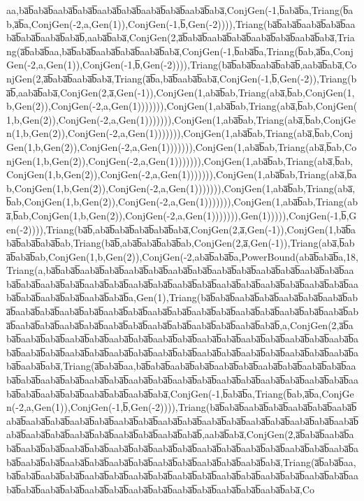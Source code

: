 aa,ba̅b̅aba̅b̅aaba̅b̅aba̅b̅aaba̅b̅aba̅b̅aaba̅b̅aba̅b̅aaba̅b̅aba̅,ConjGen(-1,b̅aba̅b̅a,Triang(b̅ab,a̅b̅a,ConjGen(-2,a,Gen(1)),ConjGen(-1,b̅,Gen(-2)))),Triang(ba̅b̅aba̅b̅aaba̅b̅aba̅b̅aaba̅b̅aba̅b̅aaba̅b̅aba̅b̅,aaba̅b̅aba̅,ConjGen(2,a̅b̅aba̅b̅aaba̅b̅aba̅b̅aaba̅b̅aba̅b̅aaba̅b̅aba̅,Triang(a̅b̅aba̅b̅aa,ba̅b̅aba̅b̅aaba̅b̅aba̅b̅aaba̅b̅aba̅,ConjGen(-1,b̅aba̅b̅a,Triang(b̅ab,a̅b̅a,ConjGen(-2,a,Gen(1)),ConjGen(-1,b̅,Gen(-2)))),Triang(ba̅b̅aba̅b̅aaba̅b̅aba̅b̅,aaba̅b̅aba̅,ConjGen(2,a̅b̅aba̅b̅aaba̅b̅aba̅,Triang(a̅b̅a,ba̅b̅aaba̅b̅aba̅,ConjGen(-1,b̅,Gen(-2)),Triang(ba̅b̅,aaba̅b̅aba̅,ConjGen(2,a̅,Gen(-1)),ConjGen(1,aba̅b̅ab,Triang(aba̅,b̅ab,ConjGen(1,b,Gen(2)),ConjGen(-2,a,Gen(1))))))),ConjGen(1,aba̅b̅ab,Triang(aba̅,b̅ab,ConjGen(1,b,Gen(2)),ConjGen(-2,a,Gen(1))))))),ConjGen(1,aba̅b̅ab,Triang(aba̅,b̅ab,ConjGen(1,b,Gen(2)),ConjGen(-2,a,Gen(1))))))),ConjGen(1,aba̅b̅ab,Triang(aba̅,b̅ab,ConjGen(1,b,Gen(2)),ConjGen(-2,a,Gen(1))))))),ConjGen(1,aba̅b̅ab,Triang(aba̅,b̅ab,ConjGen(1,b,Gen(2)),ConjGen(-2,a,Gen(1))))))),ConjGen(1,aba̅b̅ab,Triang(aba̅,b̅ab,ConjGen(1,b,Gen(2)),ConjGen(-2,a,Gen(1))))))),ConjGen(1,aba̅b̅ab,Triang(aba̅,b̅ab,ConjGen(1,b,Gen(2)),ConjGen(-2,a,Gen(1))))))),ConjGen(1,aba̅b̅ab,Triang(aba̅,b̅ab,ConjGen(1,b,Gen(2)),ConjGen(-2,a,Gen(1))))))),ConjGen(1,aba̅b̅ab,Triang(aba̅,b̅ab,ConjGen(1,b,Gen(2)),ConjGen(-2,a,Gen(1))))))),Gen(1))))),ConjGen(-1,b̅,Gen(-2)))),Triang(ba̅b̅,aba̅b̅aba̅b̅aba̅b̅aba̅b̅aba̅,ConjGen(2,a̅,Gen(-1)),ConjGen(1,ba̅b̅aba̅b̅aba̅b̅aba̅b̅ab,Triang(ba̅b̅,aba̅b̅aba̅b̅aba̅b̅ab,ConjGen(2,a̅,Gen(-1)),Triang(aba̅,b̅aba̅b̅aba̅b̅ab,ConjGen(1,b,Gen(2)),ConjGen(-2,aba̅b̅aba̅b̅a,PowerBound(aba̅b̅aba̅b̅a,18,Triang(a,ba̅b̅aba̅b̅aaba̅b̅aba̅b̅aaba̅b̅aba̅b̅aaba̅b̅aba̅b̅aaba̅b̅aba̅b̅aaba̅b̅aba̅b̅aaba̅b̅aba̅b̅aaba̅b̅aba̅b̅aaba̅b̅aba̅b̅aaba̅b̅aba̅b̅aaba̅b̅aba̅b̅aaba̅b̅aba̅b̅aaba̅b̅aba̅b̅aaba̅b̅aba̅b̅aaba̅b̅aba̅b̅aaba̅b̅aba̅b̅aaba̅b̅aba̅b̅aaba̅b̅aba̅b̅a,Gen(1),Triang(ba̅b̅aba̅b̅aaba̅b̅aba̅b̅aaba̅b̅aba̅b̅aaba̅b̅aba̅b̅aaba̅b̅aba̅b̅aaba̅b̅aba̅b̅aaba̅b̅aba̅b̅aaba̅b̅aba̅b̅aaba̅b̅aba̅b̅aaba̅b̅aba̅b̅aaba̅b̅aba̅b̅aaba̅b̅aba̅b̅aaba̅b̅aba̅b̅aaba̅b̅aba̅b̅aaba̅b̅aba̅b̅aaba̅b̅aba̅b̅aaba̅b̅aba̅b̅aaba̅b̅aba̅b̅,a,ConjGen(2,a̅b̅aba̅b̅aaba̅b̅aba̅b̅aaba̅b̅aba̅b̅aaba̅b̅aba̅b̅aaba̅b̅aba̅b̅aaba̅b̅aba̅b̅aaba̅b̅aba̅b̅aaba̅b̅aba̅b̅aaba̅b̅aba̅b̅aaba̅b̅aba̅b̅aaba̅b̅aba̅b̅aaba̅b̅aba̅b̅aaba̅b̅aba̅b̅aaba̅b̅aba̅b̅aaba̅b̅aba̅b̅aaba̅b̅aba̅b̅aaba̅b̅aba̅b̅aaba̅b̅aba̅,Triang(a̅b̅aba̅b̅aa,ba̅b̅aba̅b̅aaba̅b̅aba̅b̅aaba̅b̅aba̅b̅aaba̅b̅aba̅b̅aaba̅b̅aba̅b̅aaba̅b̅aba̅b̅aaba̅b̅aba̅b̅aaba̅b̅aba̅b̅aaba̅b̅aba̅b̅aaba̅b̅aba̅b̅aaba̅b̅aba̅b̅aaba̅b̅aba̅b̅aaba̅b̅aba̅b̅aaba̅b̅aba̅b̅aaba̅b̅aba̅b̅aaba̅b̅aba̅b̅aaba̅b̅aba̅,ConjGen(-1,b̅aba̅b̅a,Triang(b̅ab,a̅b̅a,ConjGen(-2,a,Gen(1)),ConjGen(-1,b̅,Gen(-2)))),Triang(ba̅b̅aba̅b̅aaba̅b̅aba̅b̅aaba̅b̅aba̅b̅aaba̅b̅aba̅b̅aaba̅b̅aba̅b̅aaba̅b̅aba̅b̅aaba̅b̅aba̅b̅aaba̅b̅aba̅b̅aaba̅b̅aba̅b̅aaba̅b̅aba̅b̅aaba̅b̅aba̅b̅aaba̅b̅aba̅b̅aaba̅b̅aba̅b̅aaba̅b̅aba̅b̅aaba̅b̅aba̅b̅aaba̅b̅aba̅b̅,aaba̅b̅aba̅,ConjGen(2,a̅b̅aba̅b̅aaba̅b̅aba̅b̅aaba̅b̅aba̅b̅aaba̅b̅aba̅b̅aaba̅b̅aba̅b̅aaba̅b̅aba̅b̅aaba̅b̅aba̅b̅aaba̅b̅aba̅b̅aaba̅b̅aba̅b̅aaba̅b̅aba̅b̅aaba̅b̅aba̅b̅aaba̅b̅aba̅b̅aaba̅b̅aba̅b̅aaba̅b̅aba̅b̅aaba̅b̅aba̅b̅aaba̅b̅aba̅,Triang(a̅b̅aba̅b̅aa,ba̅b̅aba̅b̅aaba̅b̅aba̅b̅aaba̅b̅aba̅b̅aaba̅b̅aba̅b̅aaba̅b̅aba̅b̅aaba̅b̅aba̅b̅aaba̅b̅aba̅b̅aaba̅b̅aba̅b̅aaba̅b̅aba̅b̅aaba̅b̅aba̅b̅aaba̅b̅aba̅b̅aaba̅b̅aba̅b̅aaba̅b̅aba̅b̅aaba̅b̅aba̅b̅aaba̅b̅aba̅,Co